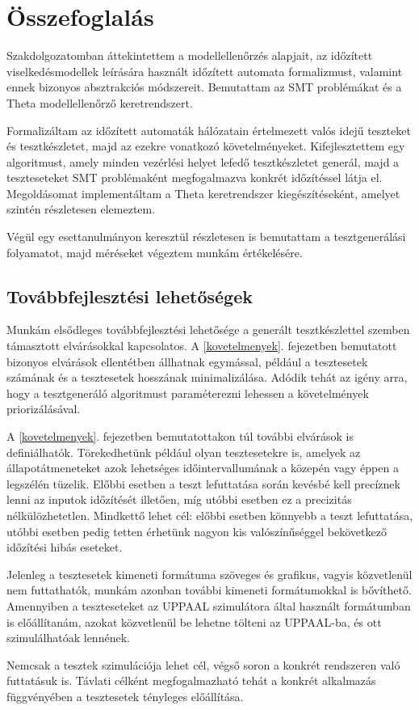 
\chapter{Összefoglalás} \label{osszefoglalas}

Szakdolgozatomban áttekintettem a modellellenőrzés alapjait, az időzített viselkedésmodellek leírására használt időzített automata formalizmust, valamint ennek bizonyos absztrakciós módszereit. Bemutattam az SMT problémákat és a Theta modellellenőrző keretrendszert.

Formalizáltam az időzített automaták hálózatain értelmezett valós idejű teszteket és tesztkészletet, majd az ezekre vonatkozó követelményeket. Kifejlesztettem egy algoritmust, amely minden vezérlési helyet lefedő tesztkészletet generál, majd a teszteseteket SMT problémaként megfogalmazva konkrét időzítéssel látja el. Megoldásomat implementáltam a Theta keretrendszer kiegészítéseként, amelyet szintén részletesen elemeztem.

Végül egy esettanulmányon keresztül részletesen is bemutattam a tesztgenerálási folyamatot, majd méréseket végeztem munkám értékelésére.

\section{Továbbfejlesztési lehetőségek} \label{tovabbfejlesztes}

Munkám elsődleges továbbfejlesztési lehetősége a generált tesztkészlettel szemben támasztott elvárásokkal kapcsolatos. A \ref{kovetelmenyek}. fejezetben bemutatott bizonyos elvárások ellentétben állhatnak egymással, például a tesztesetek számának és a tesztesetek hosszának minimalizálása. Adódik tehát az igény arra, hogy a tesztgeneráló algoritmust paraméterezni lehessen a követelmények priorizálásával.

A \ref{kovetelmenyek}. fejezetben bemutatottakon túl további elvárások is definiálhatók. Törekedhetünk például olyan tesztesetekre is, amelyek az állapotátmeneteket azok lehetséges időintervallumának a közepén vagy éppen a legszélén tüzelik. Előbbi esetben a teszt lefuttatása során kevésbé kell precíznek lenni az inputok időzítését illetően, míg utóbbi esetben ez a precizitás nélkülözhetetlen. Mindkettő lehet cél: előbbi esetben könnyebb a teszt lefuttatása, utóbbi esetben pedig tetten érhetünk nagyon kis valószínűséggel bekövetkező időzítési hibás eseteket.

Jelenleg a tesztesetek kimeneti formátuma szöveges és grafikus, vagyis közvetlenül nem futtathatók, munkám azonban további kimeneti formátumokkal is bővíthető. Amennyiben a teszteseteket az UPPAAL szimulátora által használt formátumban is előállítanám, azokat közvetlenül be lehetne tölteni az UPPAAL-ba, és ott szimulálhatóak lennének.

Nemcsak a tesztek szimulációja lehet cél, végső soron a konkrét rendszeren való futtatásuk is. Távlati célként megfogalmazható tehát a konkrét alkalmazás függvényében a tesztesetek tényleges előállítása.